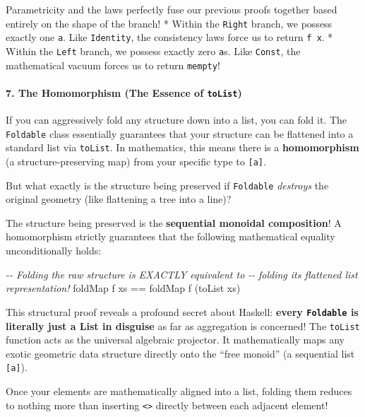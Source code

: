 \documentclass[
]{article}
\newenvironment{Shaded}{}{}
\newcommand{\CommentTok}[1]{\textcolor[rgb]{0.38,0.63,0.69}{\textit{#1}}}
\newcommand{\FunctionTok}[1]{\textcolor[rgb]{0.02,0.16,0.49}{#1}}
\newcommand{\NormalTok}[1]{#1}
\newcommand{\OperatorTok}[1]{\textcolor[rgb]{0.40,0.40,0.40}{#1}}
\begin{document}
Parametricity and the laws perfectly fuse our previous proofs together
based entirely on the shape of the branch! * Within the \texttt{Right}
branch, we possess exactly one \texttt{a}. Like \texttt{Identity}, the
consistency laws force us to return \texttt{f\ x}. * Within the
\texttt{Left} branch, we possess exactly zero \texttt{a}s. Like
\texttt{Const}, the mathematical vacuum forces us to return
\texttt{mempty}!

\paragraph{\texorpdfstring{7. The Homomorphism (The Essence of
\texttt{toList})}{7. The Homomorphism (The Essence of toList)}}\label{the-homomorphism-the-essence-of-tolist}

If you can aggressively fold any structure down into a list, you can
fold it. The \texttt{Foldable} class essentially guarantees that your
structure can be flattened into a standard list via \texttt{toList}. In
mathematics, this means there is a \textbf{homomorphism} (a
structure-preserving map) from your specific type to \texttt{{[}a{]}}.

But what exactly is the structure being preserved if \texttt{Foldable}
\emph{destroys} the original geometry (like flattening a tree into a
line)?

The structure being preserved is the \textbf{sequential monoidal
composition}! A homomorphism strictly guarantees that the following
mathematical equality unconditionally holds:

\begin{Shaded}
\begin{Highlighting}[]
\CommentTok{{-}{-} Folding the raw structure is EXACTLY equivalent to }
\CommentTok{{-}{-} folding its flattened list representation!}
\FunctionTok{foldMap}\NormalTok{ f xs }\OperatorTok{==} \FunctionTok{foldMap}\NormalTok{ f (toList xs)}
\end{Highlighting}
\end{Shaded}

This structural proof reveals a profound secret about Haskell:
\textbf{every \texttt{Foldable} is literally just a List in disguise} as
far as aggregation is concerned! The \texttt{toList} function acts as
the universal algebraic projector. It mathematically maps any exotic
geometric data structure directly onto the ``free monoid'' (a sequential
list \texttt{{[}a{]}}).

Once your elements are mathematically aligned into a list, folding them
reduces to nothing more than inserting
\texttt{\textless{}\textgreater{}} directly between each adjacent
element!
\end{document}
